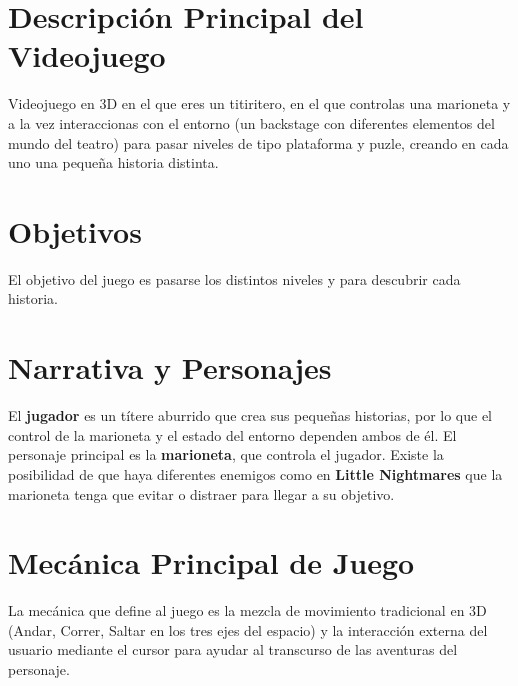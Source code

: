 \documentclass[12pt,twoside,letterpaper]{article}
\begin{document}



\newpage


\section{Descripción Principal del Videojuego}

Videojuego en 3D en el que eres un titiritero, en el que controlas una marioneta y a la vez interaccionas con el entorno (un backstage con diferentes elementos del mundo del teatro) para pasar niveles de tipo plataforma y puzle, creando en cada uno una pequeña historia distinta.

\section{Objetivos}

El objetivo del juego es pasarse los distintos niveles y para descubrir cada historia.

\section{Narrativa y Personajes}

El \textbf{jugador} es un títere aburrido que crea sus pequeñas historias, por lo que el control de la marioneta y el estado del entorno dependen ambos de él.
El personaje principal es la \textbf{marioneta}, que controla el jugador.
Existe la posibilidad de que haya diferentes enemigos como en \textbf{Little Nightmares} que la marioneta tenga que evitar o distraer para llegar a su objetivo.


\section{Mecánica Principal de Juego}

La mecánica que define al juego es la mezcla de movimiento tradicional en 3D (Andar, Correr, Saltar en los tres ejes del espacio) y la interacción externa del usuario mediante el cursor para ayudar al transcurso de las aventuras del personaje.
\end{document}
